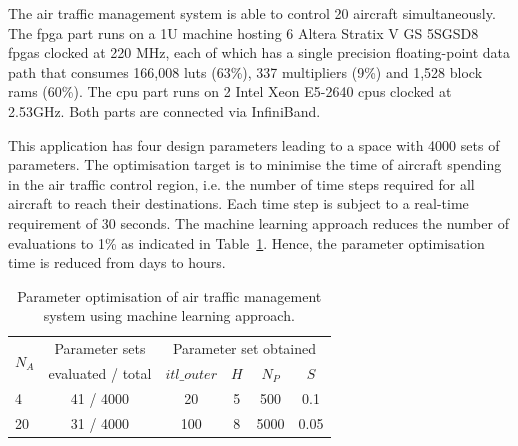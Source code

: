 The air traffic management system is able to control 20 aircraft simultaneously.
The \gls{fpga} part runs on a 1U machine hosting 6 Altera Stratix V GS 5SGSD8 \glspl{fpga} clocked at 220 MHz, 
each of which has a single precision floating-point data path that consumes 166,008 \glspl{lut} (63\%), 337 multipliers (9\%) and 1,528 block \glspl{ram} (60\%).
The \gls{cpu} part runs on 2 Intel Xeon E5-2640 \glspl{cpu} clocked at 2.53GHz.
Both parts are connected via InfiniBand.

This application has four design parameters leading to a space with 4000 sets of parameters.
The optimisation target is to minimise the time of aircraft spending in the air traffic control region,
i.e. the number of time steps required for all aircraft to reach their destinations.
Each time step is subject to a real-time requirement of 30 seconds.
The machine learning approach reduces the number of evaluations to 1\% as indicated in Table~\ref{tab:dse}.
Hence, the parameter optimisation time is reduced from days to hours.

\begin{table}[ht]
	\begin{spacing}{1.0}
	\caption{Parameter optimisation of air traffic management system using machine learning approach.}
	\label{tab:dse}
	\centering
	\smallskip
	\begin{threeparttable}
		\begin{tabular}{l|c|c c c c}
			\hline
			\multirow{2}{*}{$N_A$}			& Parameter	sets		& \multicolumn{4}{|c}{Parameter set obtained} \\
			\cline{3-6}
																	& evaluated / total					& $itl\_outer$  		& $H$ & $N_P$ & $S$ \\
			\hline
			\hline
			4 													& 41 / 4000											& 20								&	5		&	500	  & 0.1 \\
			20													& 31 / 4000 											& 100								&	8		&	5000	& 0.05 \\
			\hline
		\end{tabular}
	\end{threeparttable}
	\end{spacing}
\end{table}

